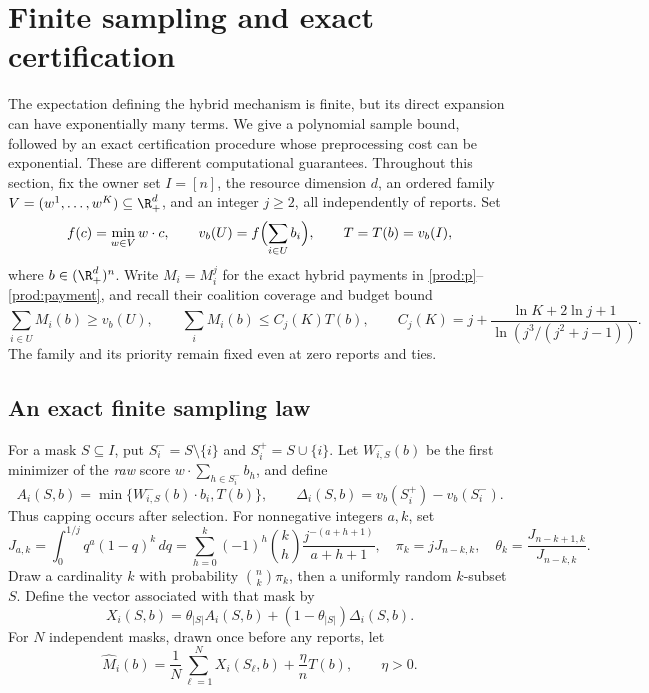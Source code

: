 \section{Finite sampling and exact certification}\label{alg:section}
The expectation defining the hybrid mechanism is finite, but its direct
expansion can have exponentially many terms.  We give a polynomial sample
bound, followed by an exact certification procedure whose preprocessing cost
can be exponential.  These are different computational guarantees.
Throughout this section, fix the owner set $I=[n]$, the resource dimension $d$,
an ordered family $V=(w^1,\ldots,w^K)\subseteq\R_+^d$, and an integer $j\ge2$,
all independently of reports.  Set
\[
 f(c)=\min_{w\in V}w\cdot c,\qquad
 v_b(U)=f\Bigl(\sum_{i\in U}b_i\Bigr),\qquad T=T(b)=v_b(I),
\]
where $b\in(\R_+^d)^n$. Write $M_i=M_i^j$ for the exact hybrid payments
in \eqref{prod:p}--\eqref{prod:payment}, and recall their coalition coverage and budget bound
\begin{equation}\label{alg:exact-budget}
 \sum_{i\in U}M_i(b)\ge v_b(U),\qquad
 \sum_iM_i(b)\le C_j(K)T(b),\qquad
 C_j(K)=j+\frac{\ln K+2\ln j+1}{\ln(j^3/(j^2+j-1))}.
\end{equation}
The family and its priority remain fixed even at zero reports and ties.

\subsection{An exact finite sampling law}
For a mask $S\subseteq I$, put $S_i^-=S\setminus\{i\}$ and
$S_i^+=S\cup\{i\}$.  Let $W^-_{i,S}(b)$ be the first minimizer of the
\emph{raw} score $w\cdot\sum_{h\in S_i^-}b_h$, and define
\begin{equation}\label{alg:sample-components}
 A_i(S,b)=\min\{W^-_{i,S}(b)\cdot b_i,T(b)\},\qquad
 \Delta_i(S,b)=v_b(S_i^+)-v_b(S_i^-).
\end{equation}
Thus capping occurs after selection.  For nonnegative integers $a,k$, set
\begin{equation}\label{alg:integrals}
 J_{a,k}=\int_0^{1/j}q^a(1-q)^k\,dq
 =\sum_{h=0}^k(-1)^h\binom kh\frac{j^{-(a+h+1)}}{a+h+1},
 \quad \pi_k=jJ_{n-k,k},\quad
 \theta_k=\frac{J_{n-k+1,k}}{J_{n-k,k}}.
\end{equation}
Draw a cardinality $k$ with probability $\binom nk\pi_k$, then a uniformly
random $k$-subset $S$.  Define the vector associated with that mask by
\begin{equation}\label{alg:finite-sample}
 X_i(S,b)=\theta_{|S|}A_i(S,b)+(1-\theta_{|S|})\Delta_i(S,b).
\end{equation}
For $N$ independent masks, drawn once before any reports, let
\begin{equation}\label{alg:sample-payment}
 \widehat M_i(b)=\frac1N\sum_{\ell=1}^N X_i(S_\ell,b)
                       +\frac{\eta}{n}T(b),\qquad \eta>0.
\end{equation}

